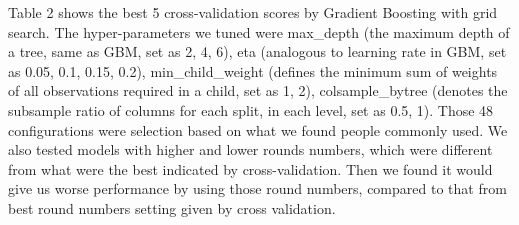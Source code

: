 \documentclass[11pt]{article}
\begin{document}
Table 2 shows the best 5 cross-validation scores by Gradient Boosting with grid search. The hyper-parameters we tuned were max\_depth (the maximum depth of a tree, same as GBM, set as 2, 4, 6), eta (analogous to learning rate in GBM, set as 0.05, 0.1, 0.15, 0.2),  min\_child\_weight (defines the minimum sum of weights of all observations required in a child, set as 1, 2), colsample\_bytree (denotes the subsample ratio of columns for each split, in each level, set as 0.5, 1). Those 48 configurations were selection based on what we found people commonly used. We also tested models with higher and lower rounds numbers, which were different from what were the best indicated by cross-validation. Then we found it would give us worse performance by using those round numbers, compared to that from best round numbers setting given by cross validation.
\end{document}
